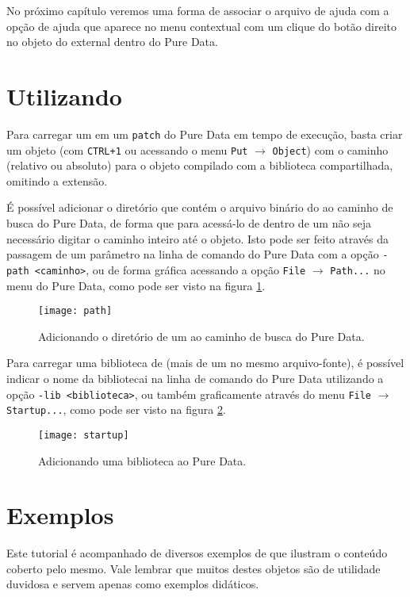 
No próximo capítulo veremos uma forma de associar o arquivo de ajuda com a
opção de ajuda que aparece no menu contextual com um clique do botão direito
no objeto do external dentro do Pure Data.

\section{Utilizando \externals}
\label{sec:using}

Para carregar um \external em um \texttt{patch} do Pure Data em tempo de
execução, basta criar um objeto (com \texttt{CTRL+1} ou acessando o menu
\texttt{Put} $\rightarrow$ \texttt{Object}) com o caminho (relativo ou
absoluto) para o objeto compilado com a biblioteca compartilhada, omitindo a
extensão.

É possível adicionar o diretório que contém o arquivo binário do \external ao
caminho de busca do Pure Data, de forma que para acessá-lo de dentro de um
\patch não seja necessário digitar o caminho inteiro até o objeto. Isto pode
ser feito através da passagem de um parâmetro na linha de comando do Pure Data
com a opção \texttt{-path <caminho>}, ou de forma gráfica acessando a opção
\texttt{File} $\rightarrow$ \texttt{Path...} no menu do Pure Data,
como pode ser visto na figura \ref{fig:search-path}.

\begin{figure}[h!]
  \centering
  \texttt{[image: path]}
  \caption{Adicionando o diretório de um \external ao caminho de busca do Pure Data.}
  \label{fig:search-path}
\end{figure}

Para carregar uma biblioteca de \externals (mais de um \external no mesmo
arquivo-fonte), é possível indicar o nome da bibliotecai na linha
de comando do Pure Data utilizando a opção \texttt{-lib <biblioteca>}, ou
também graficamente através do menu \texttt{File} $\rightarrow$
\texttt{Startup...}, como pode ser visto na figura \ref{fig:lib}.

\begin{figure}[h!]
  \centering
  \texttt{[image: startup]}
  \caption{Adicionando uma biblioteca ao Pure Data.}
  \label{fig:lib}
\end{figure}

\section{Exemplos}
Este tutorial é acompanhado de diversos exemplos de \externals que ilustram o
conteúdo coberto pelo mesmo.
Vale lembrar que muitos destes objetos são de utilidade duvidosa e servem apenas
como exemplos didáticos.
